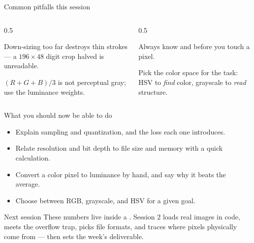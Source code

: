 \documentclass[10pt,aspectratio=169]{beamer}
\begin{document}
\begin{frame}{Common pitfalls this session}
  \begin{columns}[T]
    \begin{column}{0.5\textwidth}
      \begin{badbox}
        Down-sizing too far destroys thin strokes — a $196\times48$ digit crop halved is unreadable.
      \end{badbox}
      \begin{badbox}
        \((R+G+B)/3\) is not perceptual gray; use the luminance weights.
      \end{badbox}
    \end{column}
    \begin{column}{0.5\textwidth}
      \begin{goodbox}
        Always know  and  before you touch a pixel.
      \end{goodbox}
      \begin{goodbox}
        Pick the color space for the task: HSV to \emph{find} color, grayscale to \emph{read} structure.
      \end{goodbox}
    \end{column}
  \end{columns}
\end{frame}

\begin{frame}{What you should now be able to do}
  \begin{itemize}
    \item Explain sampling and quantization, and the loss each one introduces.
    \item Relate resolution and bit depth to file size and memory with a quick calculation.
    \item Convert a color pixel to luminance by hand, and say why it beats the average.
    \item Choose between RGB, grayscale, and HSV for a given goal.
  \end{itemize}
\end{frame}

\begin{frame}[standout]
  Next session
  \vspace{4pt}
  \normalsize These numbers live inside a . Session 2 loads real images in code,
  meets the  overflow trap, picks file formats, and traces where pixels physically
  come from — then sets the week's deliverable.
\end{frame}
\end{document}
